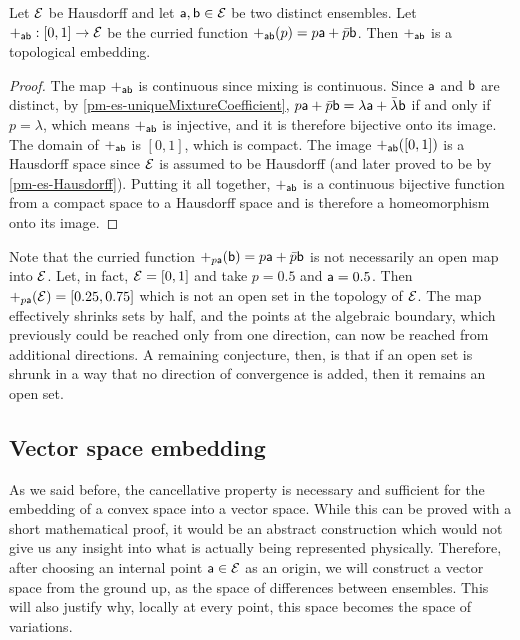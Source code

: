 \begin{mathSection}
\begin{prop}
	Let $\Ens$ be Hausdorff and let $\ens[a], \ens[b] \in \Ens$ be two distinct ensembles. Let $+_{\ens[a]\ens[b]} : [0,1] \to \Ens$ be the curried function $+_{\ens[a]\ens[b]}(p) = p\ens[a] + \bar{p}\ens[b]$. Then $+_{\ens[a]\ens[b]}$ is a topological embedding.
\end{prop}

\begin{proof}
	The map $+_{\ens[a]\ens[b]}$ is continuous since mixing is continuous. Since $\ens[a]$ and $\ens[b]$ are distinct, by \ref{pm-es-uniqueMixtureCoefficient}, $p\ens[a] + \bar{p} \ens[b] = \lambda \ens[a] + \bar{\lambda} \ens[b]$ if and only if $p=\lambda$, which means $+_{\ens[a]\ens[b]}$ is injective, and it is therefore bijective onto its image. The domain of $+_{\ens[a]\ens[b]}$ is $[0,1]$, which is compact. The image $+_{\ens[a]\ens[b]}([0,1])$ is a Hausdorff space since $\Ens$ is assumed to be Hausdorff (and later proved to be by \ref{pm-es-Hausdorff}). Putting it all together, $+_{\ens[a]\ens[b]}$ is a continuous bijective function from a compact space to a Hausdorff space and is therefore a homeomorphism onto its image.
\end{proof}
\end{mathSection}

Note that the curried function $+_{p\ens[a]}(\ens[b]) = p\ens[a] + \bar{p}\ens[b]$ is not necessarily an open map into $\Ens$. Let, in fact, $\Ens = [0,1]$ and take $p = 0.5$ and $\ens[a] = 0.5$. Then $+_{p\ens[a]}(\Ens) = [0.25,0.75]$ which is not an open set in the topology of $\Ens$. The map effectively shrinks sets by half, and the points at the algebraic boundary, which previously could be reached only from one direction, can now be reached from additional directions. A remaining conjecture, then, is that if an open set is shrunk in a way that no direction of convergence is added, then it remains an open set.

\subsection{Vector space embedding}

As we said before, the cancellative property is necessary and sufficient for the embedding of a convex space into a vector space. While this can be proved with a short mathematical proof, it would be an abstract construction which would not give us any insight into what is actually being represented physically. Therefore, after choosing an internal point $\ens[a] \in \Ens$ as an origin, we will construct a vector space from the ground up, as the space of differences between ensembles. This will also justify why, locally at every point, this space becomes the space of variations.

